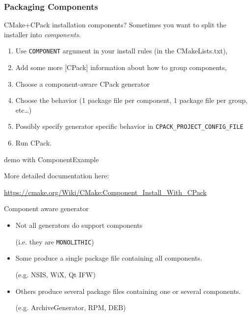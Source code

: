 \documentclass[compress,slidestop,table,usepdftitle=false
              ]
               {beamer}
\newcommand{\fname}[1]{\texttt{#1}}
\begin{document}
\begin{frame}
\frametitle{Packaging Components}
\vspace*{-0.7cm}
\begin{block}{CMake+CPack installation components?}
Sometimes you want to split the installer into \emph{components}.
\end{block}
\vspace*{-0.7cm}
\begin{enumerate}
\item Use \fname{COMPONENT} argument in your install rules
      (in the CMakeLists.txt),
\item Add some more [CPack] information about how to group
      components,
\item Choose a component-aware CPack generator
\item Choose the behavior (1 package file per component, 1 package file
      per group, etc\ldots)
\item Possibly specify generator specific behavior in \fname{CPACK\_PROJECT\_CONFIG\_FILE}
\item Run CPack.
\end{enumerate}
\begin{center}
\alert{demo with ComponentExample}
\end{center}

More detailed documentation here:

{\scriptsize \url{https://cmake.org/Wiki/CMake:Component_Install_With_CPack}}
\begin{alertblock}{Component aware generator}
\begin{itemize}
\item Not all generators do support components

      (i.e. they are \fname{MONOLITHIC})
\item Some produce a single package file containing all components.

      (e.g. NSIS, WiX, Qt IFW)
\item Others produce several package files containing one or several components.

      (e.g. ArchiveGenerator, RPM, DEB)
\end{itemize}
\end{alertblock}
\end{frame}


\end{document}
